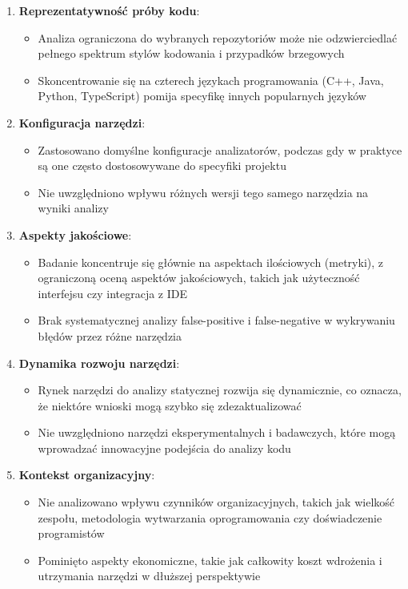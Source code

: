 \documentclass[a4paper,12pt]{article}
\begin{document}
\begin{enumerate}
\item \textbf{Reprezentatywność próby kodu}:
\begin{itemize}
\item Analiza ograniczona do wybranych repozytoriów może nie odzwierciedlać pełnego spektrum stylów kodowania i przypadków brzegowych
\item Skoncentrowanie się na czterech językach programowania (C++, Java, Python, TypeScript) pomija specyfikę innych popularnych języków
\end{itemize}

\item \textbf{Konfiguracja narzędzi}:
\begin{itemize}
\item Zastosowano domyślne konfiguracje analizatorów, podczas gdy w praktyce są one często dostosowywane do specyfiki projektu
\item Nie uwzględniono wpływu różnych wersji tego samego narzędzia na wyniki analizy
\end{itemize}

\item \textbf{Aspekty jakościowe}:
\begin{itemize}
\item Badanie koncentruje się głównie na aspektach ilościowych (metryki), z ograniczoną oceną aspektów jakościowych, takich jak użyteczność interfejsu czy integracja z IDE
\item Brak systematycznej analizy false-positive i false-negative w wykrywaniu błędów przez różne narzędzia
\end{itemize}

\item \textbf{Dynamika rozwoju narzędzi}:
\begin{itemize}
\item Rynek narzędzi do analizy statycznej rozwija się dynamicznie, co oznacza, że niektóre wnioski mogą szybko się zdezaktualizować
\item Nie uwzględniono narzędzi eksperymentalnych i badawczych, które mogą wprowadzać innowacyjne podejścia do analizy kodu
\end{itemize}

\item \textbf{Kontekst organizacyjny}:
\begin{itemize}
\item Nie analizowano wpływu czynników organizacyjnych, takich jak wielkość zespołu, metodologia wytwarzania oprogramowania czy doświadczenie programistów
\item Pominięto aspekty ekonomiczne, takie jak całkowity koszt wdrożenia i utrzymania narzędzi w dłuższej perspektywie
\end{itemize}
\end{enumerate}
\end{document}
